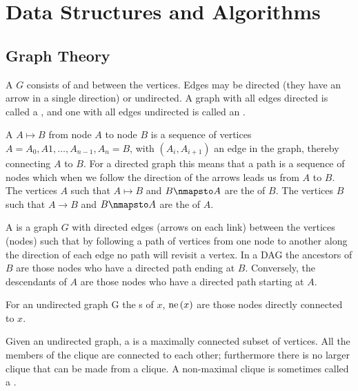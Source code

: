 \chapter{Data Structures and Algorithms}

\section{Graph Theory}

\begin{defi}[Graph]
A  $G$ consists of  and  between the vertices. Edges may be directed (they have an arrow in a single direction) or undirected. A graph with all edges directed is called a , and one with all edges undirected is called an .
\cite{Barber2011}
\end{defi}

\begin{defi}
A  $A\mapsto B$ from node $A$ to node $B$ is a sequence of vertices $A=A_0,A1,\ldots,A_{n-1},A_n=B$, with $\left(A_i,A_{i+1}\right)$ an edge in the graph, thereby connecting $A$ to $B$. For a directed graph this means that a path is a sequence of nodes which when we follow the direction of the arrows leads us from $A$ to $B$. The vertices $A$ such that $A\mapsto B$ and $B\nmapsto A$ are the  of $B$. The vertices $B$ such that $A → B$ and $B\nmapsto A$ are the  of $A$.
\cite{Barber2011}
\end{defi}

\begin{defi}
A  is a graph $G$ with directed edges (arrows on each link) between the vertices (nodes) such that by following a path of vertices from one node to another along the direction of each edge no path will revisit a vertex. In a DAG the ancestors of $B$ are those nodes who have a directed path ending at $B$. Conversely, the descendants of $A$ are those nodes who have a directed path starting at $A$.
\cite{Barber2011}
\end{defi}

\begin{defi}[Neighbour]
For an undirected graph G the s of $x$, $\mbox{ne}\left(x\right)$ are those nodes directly connected to $x$.
\cite{Barber2011}
\end{defi}

\begin{defi}
Given an undirected graph, a  is a maximally connected subset of vertices. All the members of the clique are connected to each other; furthermore there is no larger clique that can be made from a clique. A non-maximal clique is sometimes called a .
\cite{Barber2011}
\end{defi}

